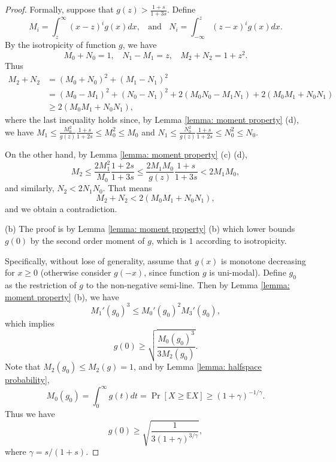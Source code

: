 \documentclass[11pt]{article}
\newcommand{\E}{\mathbb{E}}
\begin{document}
{{{{\begin{proof}
Formally, suppose that $g(z)>\frac{1+s}{1+3s}$. Define
\begin{equation*}
M_i=\int_z^{\infty}(x-z)^ig(x)dx,\ \ \ \ \mbox{and}\ \ \ \ N_i=\int_{-\infty}^z(z-x)^ig(x)dx.
\end{equation*}
By the isotropicity of function $g$, we have
\begin{equation*}
M_0+N_0=1,\ \ \ \ N_1-M_1=z,\ \ \ \ M_2+N_2=1+z^2.
\end{equation*}
Thus
\begin{equation*}
\begin{split}
M_2+N_2&=(M_0+N_0)^2+(M_1-N_1)^2\\
&=(M_0-M_1)^2+(N_0-N_1)^2+2(M_0N_0-M_1N_1)+2(M_0M_1+N_0N_1)\\
&\ge 2(M_0M_1+N_0N_1),
\end{split}
\end{equation*}
where the last inequality holds since, by Lemma \ref{lemma: moment property} (d), we have $M_1\le\frac{M_0^2}{g(z)}\frac{1+s}{1+2s}\le M_0^2\le M_0$ and $N_1\le\frac{N_0^2}{g(z)}\frac{1+s}{1+2s}\le N_0^2\le N_0$.

On the other hand, by Lemma \ref{lemma: moment property} (c) (d),
\begin{equation*}
M_2\le \frac{2M_1^2}{M_0}\frac{1+2s}{1+3s}\le \frac{2M_1M_0}{g(z)}\frac{1+s}{1+3s}<2M_1M_0,
\end{equation*}
and similarly, $N_2<2N_1N_0$. That means
\begin{equation*}
M_2+N_2<2(M_0M_1+N_0N_1),
\end{equation*}
and we obtain a contradiction.

(b) The proof is by Lemma \ref{lemma: moment property} (b) which lower bounds $g(0)$ by the second order moment of $g$, which is $1$ according to isotropicity.

Specifically, without lose of generality, assume that $g(x)$ is monotone decreasing for $x\ge 0$ (otherwise consider $g(-x)$, since function $g$ is uni-modal). Define $g_0$ as the restriction of $g$ to the non-negative semi-line. Then by Lemma \ref{lemma: moment property} (b), we have
\begin{equation*}
M_1'(g_0)^3\le M_0'(g_0)^2M_3'(g_0),
\end{equation*}
which implies
\begin{equation*}
g(0)\ge \sqrt{\frac{M_0(g_0)^3}{3M_2(g_0)}}.
\end{equation*}
Note that $M_2(g_0)\le M_2(g)=1$, and by Lemma \ref{lemma: halfspace probability},
\begin{equation*}
M_0(g_0)=\int_0^\infty g(t)dt=\Pr[X\ge \E X]\ge (1+\gamma)^{-1/\gamma}.
\end{equation*}
Thus we have
\begin{equation*}
g(0)\ge \sqrt{\frac{1}{3(1+\gamma)^{3/\gamma}}},
\end{equation*}
where $\gamma=s/(1+s)$.
\end{proof}

}}}}
\end{document}
